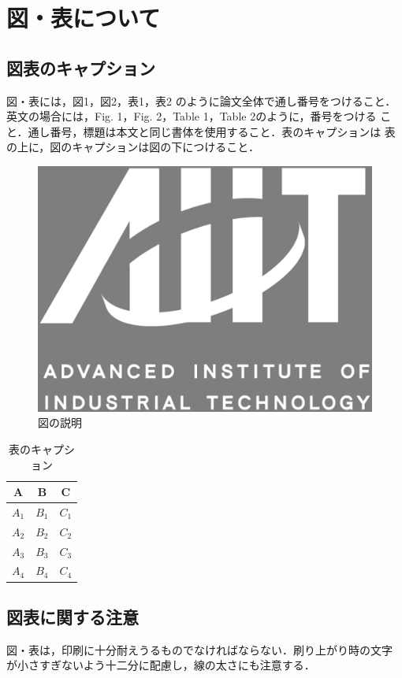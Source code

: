 \documentclass[a4j, 12Q, twocolumn, twoside]{jsarticle}
\begin{document}
\section{図・表について}
\subsection{図表のキャプション}
図・表には，図1，図2，表1，表2 のように論文全体で通し番号をつけること．
英文の場合には，Fig. 1，Fig. 2，Table 1，Table 2のように，番号をつける
こと．通し番号，標題は本文と同じ書体を使用すること．表のキャプションは
表の上に，図のキャプションは図の下につけること．

\begin{figure}
 \begin{center}
  \includegraphics[width=0.8\linewidth]{aiit_symbol.eps}
 \end{center}
 \caption{図の説明}
 \label{fig:one}
\end{figure}

\begin{table}
  \caption{表のキャプション}
  \begin{center}
    \begin{tabular}{|c|c|c|} \hline
    A & B & C \\ \hline
    $A_{1}$ & $B_{1}$ & $C_{1}$ \\ \hline
    $A_{2}$ & $B_{2}$ & $C_{2}$ \\ \hline
    $A_{3}$ & $B_{3}$ & $C_{3}$ \\ \hline
    $A_{4}$ & $B_{4}$ & $C_{4}$ \\ \hline
    \end{tabular}
  \end{center}
\end{table}

\subsection{図表に関する注意}
図・表は，印刷に十分耐えうるものでなければならない．刷り上がり時の文字
が小さすぎないよう十二分に配慮し，線の太さにも注意する．
\end{document}
